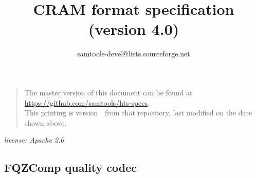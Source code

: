 \documentclass[a4paper]{article}
\begin{document}


\title{CRAM format specification (version 4.0)}
\author{samtools-devel@lists.sourceforge.net}
\date{\headdate}
\maketitle


\begin{quote}\small
The master version of this document can be found at
\url{https://github.com/samtools/hts-specs}.\\
This printing is version~\commitdesc\ from that repository,
last modified on the date shown above.
\end{quote}

\begin{center}
\textit{license: Apache 2.0}
\end{center}
\vspace*{1em}

\newlength{\maxwidth}
\newcommand{\algalign}[2] %
{\makebox[\maxwidth][l]{$#1{}$}${}#2$}

\makeatletter
\newcommand*{\bdiv}{%
  \nonscript\mskip-\medmuskip\mkern5mu%
  \mathbin{\operator@font div}\penalty900\mkern5mu%
  \nonscript\mskip-\medmuskip
}
\newcommand*{\bitand}{%
  \nonscript\mskip-\medmuskip\mkern5mu%
  \mathbin{\operator@font AND}\penalty900\mkern5mu%
  \nonscript\mskip-\medmuskip
}
\newcommand*{\bitor}{%
  \nonscript\mskip-\medmuskip\mkern5mu%
  \mathbin{\operator@font OR}\penalty900\mkern5mu%
  \nonscript\mskip-\medmuskip
}
\newcommand*{\bitxor}{%
  \nonscript\mskip-\medmuskip\mkern5mu%
  \mathbin{\operator@font XOR}\penalty900\mkern5mu%
  \nonscript\mskip-\medmuskip
}
\makeatother

\subsection*{FQZComp quality codec}
\end{document}
